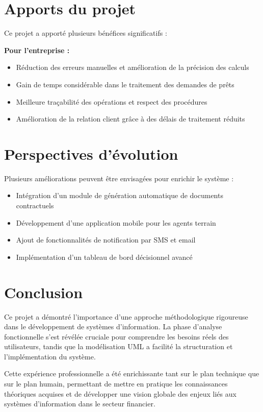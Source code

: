 \documentclass[12pt,a4paper]{report}
\begin{document}
\section*{Apports du projet}

Ce projet a apporté plusieurs bénéfices significatifs :

\textbf{Pour l'entreprise :}
\begin{itemize}
    \item Réduction des erreurs manuelles et amélioration de la précision des calculs
    \item Gain de temps considérable dans le traitement des demandes de prêts
    \item Meilleure traçabilité des opérations et respect des procédures
    \item Amélioration de la relation client grâce à des délais de traitement réduits
\end{itemize}

\section*{Perspectives d'évolution}

Plusieurs améliorations peuvent être envisagées pour enrichir le système :

\begin{itemize}
    \item Intégration d'un module de génération automatique de documents contractuels
    \item Développement d'une application mobile pour les agents terrain
    \item Ajout de fonctionnalités de notification par SMS et email
    \item Implémentation d'un tableau de bord décisionnel avancé
\end{itemize}

\section*{Conclusion}

Ce projet a démontré l'importance d'une approche méthodologique rigoureuse dans le développement de systèmes d'information. La phase d'analyse fonctionnelle s'est révélée cruciale pour comprendre les besoins réels des utilisateurs, tandis que la modélisation UML a facilité la structuration et l'implémentation du système.

Cette expérience professionnelle a été enrichissante tant sur le plan technique que sur le plan humain, permettant de mettre en pratique les connaissances théoriques acquises et de développer une vision globale des enjeux liés aux systèmes d'information dans le secteur financier.
\end{document}

